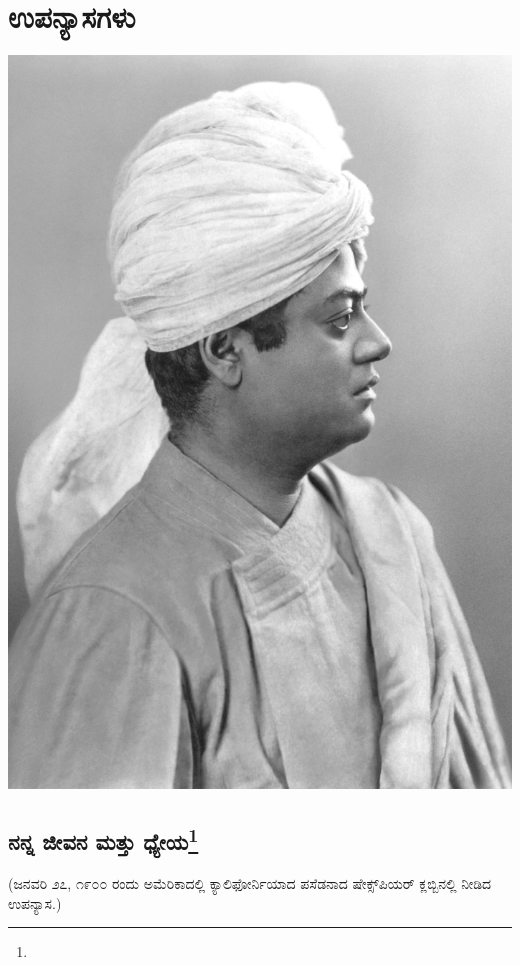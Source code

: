 

\part{ಉಪನ್ಯಾಸಗಳು}

\begin{center}
\includegraphics{images/vivekananda.jpg}
\end{center}

\chapter[ನನ್ನ ಜೀವನ ಮತ್ತು ಧ್ಯೇಯ]{ನನ್ನ ಜೀವನ ಮತ್ತು ಧ್ಯೇಯ\protect\footnote{}}

\begin{center}
(ಜನವರಿ ೨೭, ೧೯೦೦ ರಂದು ಅಮೆರಿಕಾದಲ್ಲಿ ಕ್ಯಾಲಿಫೋರ್ನಿಯಾದ ಪಸೆಡನಾದ ಷೇಕ್ಸ್‌ಪಿಯರ್ ಕ್ಲಬ್ಬಿನಲ್ಲಿ ನೀಡಿದ ಉಪನ್ಯಾಸ.)
\end{center}

